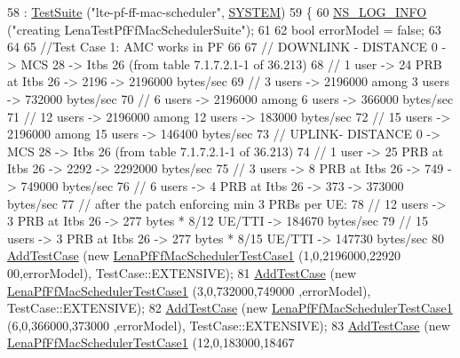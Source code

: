 \begin{DoxyCode}
58   : \hyperlink{classns3_1_1TestSuite_a904b0c40583b744d30908aeb94636d1a}{TestSuite} (\textcolor{stringliteral}{"lte-pf-ff-mac-scheduler"}, \hyperlink{classns3_1_1TestSuite_a1ebfcab34ec8161e085e8e3a1855eae0a90c5529a26ab3a5ffcc6e57040dbd82e}{SYSTEM})
59 \{
60   \hyperlink{group__logging_gafbd73ee2cf9f26b319f49086d8e860fb}{NS\_LOG\_INFO} (\textcolor{stringliteral}{"creating LenaTestPfFfMacSchedulerSuite"});
61 
62   \textcolor{keywordtype}{bool} errorModel = \textcolor{keyword}{false};
63 
64 
65   \textcolor{comment}{//Test Case 1: AMC works in PF}
66 
67   \textcolor{comment}{// DOWNLINK - DISTANCE 0 -> MCS 28 -> Itbs 26 (from table 7.1.7.2.1-1 of 36.213)}
68   \textcolor{comment}{// 1 user -> 24 PRB at Itbs 26 -> 2196 -> 2196000 bytes/sec}
69   \textcolor{comment}{// 3 users -> 2196000 among 3 users -> 732000 bytes/sec}
70   \textcolor{comment}{// 6 users -> 2196000 among 6 users -> 366000 bytes/sec}
71   \textcolor{comment}{// 12 users -> 2196000 among 12 users -> 183000 bytes/sec}
72   \textcolor{comment}{// 15 users -> 2196000 among 15 users -> 146400 bytes/sec}
73   \textcolor{comment}{// UPLINK- DISTANCE 0 -> MCS 28 -> Itbs 26 (from table 7.1.7.2.1-1 of 36.213)}
74   \textcolor{comment}{// 1 user -> 25 PRB at Itbs 26 -> 2292 -> 2292000 bytes/sec}
75   \textcolor{comment}{// 3 users -> 8 PRB at Itbs 26 -> 749 -> 749000 bytes/sec}
76   \textcolor{comment}{// 6 users -> 4 PRB at Itbs 26 -> 373 -> 373000 bytes/sec}
77   \textcolor{comment}{// after the patch enforcing min 3 PRBs per UE:}
78   \textcolor{comment}{// 12 users -> 3 PRB at Itbs 26 -> 277 bytes * 8/12 UE/TTI -> 184670 bytes/sec}
79   \textcolor{comment}{// 15 users -> 3 PRB at Itbs 26 -> 277 bytes * 8/15 UE/TTI -> 147730 bytes/sec}
80   \hyperlink{classns3_1_1TestCase_a3718088e3eefd5d6454569d2e0ddd835}{AddTestCase} (\textcolor{keyword}{new} \hyperlink{classLenaPfFfMacSchedulerTestCase1}{LenaPfFfMacSchedulerTestCase1} (1,0,2196000,22920
      00,errorModel), TestCase::EXTENSIVE);
81   \hyperlink{classns3_1_1TestCase_a3718088e3eefd5d6454569d2e0ddd835}{AddTestCase} (\textcolor{keyword}{new} \hyperlink{classLenaPfFfMacSchedulerTestCase1}{LenaPfFfMacSchedulerTestCase1} (3,0,732000,749000
      ,errorModel), TestCase::EXTENSIVE);
82   \hyperlink{classns3_1_1TestCase_a3718088e3eefd5d6454569d2e0ddd835}{AddTestCase} (\textcolor{keyword}{new} \hyperlink{classLenaPfFfMacSchedulerTestCase1}{LenaPfFfMacSchedulerTestCase1} (6,0,366000,373000
      ,errorModel), TestCase::EXTENSIVE);
83   \hyperlink{classns3_1_1TestCase_a3718088e3eefd5d6454569d2e0ddd835}{AddTestCase} (\textcolor{keyword}{new} \hyperlink{classLenaPfFfMacSchedulerTestCase1}{LenaPfFfMacSchedulerTestCase1} (12,0,183000,18467

\end{DoxyCode}
